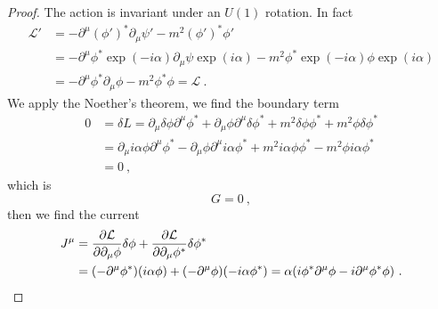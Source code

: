     \begin{proof}
        The action is invariant under an $U(1)$ rotation. In fact
        \begin{equation*}
        \begin{aligned}
            \mathcal L' & = - \partial^\mu (\phi')^* \partial_\mu \psi' - m^2 (\phi')^* \phi' \\ & = - \partial^\mu \phi^* \exp(- i \alpha) \partial_\mu \psi \exp(i \alpha) - m^2 \phi^* \exp(- i \alpha) \phi \exp(i \alpha) \\ & = - \partial^\mu \phi^* \partial_\mu \phi - m^2 \phi^* \phi = \mathcal L ~.
        \end{aligned}
        \end{equation*}
        We apply the Noether's theorem, we find the boundary term
        \begin{equation*}
        \begin{aligned}
            0 & = \delta L = \partial_\mu \delta \phi \partial^\mu \phi^* + \partial_\mu \phi \partial^\mu \delta \phi^* + m^2 \delta \phi \phi^* + m^2 \phi \delta \phi^* \\ & = \partial_\mu i \alpha \phi \partial^\mu \phi^* - \partial_\mu \phi \partial^\mu i \alpha \phi^* + m^2 i \alpha \phi \phi^* - m^2 \phi i \alpha \phi^* \\ & = 0
             ~,
        \end{aligned}
        \end{equation*}
        which is 
        \begin{equation*}
            G = 0 ~,
        \end{equation*}
        then we find the current
        \begin{equation*}
        \begin{aligned}
            J^\mu & = \frac{\partial\mathcal L}{\partial\partial_\mu \phi} \delta \phi + \frac{\partial\mathcal L}{\partial\partial_\mu \phi^*} \delta \phi^* \\ & = (- \partial^\mu \phi^*) (i \alpha \phi) + (- \partial^\mu \phi) (- i \alpha \phi^*) = \alpha (i \phi^* \partial^\mu \phi - i \partial^\mu \phi^* \phi) ~.
        \end{aligned}
        \end{equation*}
    \end{proof}

    